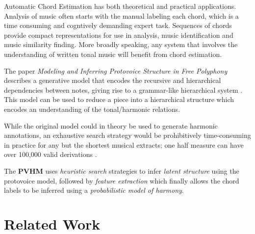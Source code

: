 \documentclass[12pt,a4paper,twoside,openright]{report}
\theoremstyle{definition}
\begin{document}
Automatic Chord Estimation has both theoretical and practical applications. 
Analysis of music often starts with the manual labeling each chord, which is a time consuming and cogntively demanding expert task. 
Sequences of chords provide compact representations for use in analysis, music identification and music similarity finding.
More broadly speaking, any system that involves the understanding of written tonal music will benefit from chord estimation. 

The paper \textit{Modeling and Inferring Protovoice Structure in Free Polyphony} describes a generative model that encodes the recursive and hierarchical dependencies between notes, giving rise to a grammar-like hierarchical system \cite{finkensiepModelingInferringProtovoice2021}.
This model can be used to reduce a piece into a hierarchical structure which encodes an understanding of the tonal/harmonic relations.



While the original model could in theory be used to generate harmonic annotations, an exhaustive search strategy would be prohibitively time-consuming in practice for any but the shortest musical extracts; one half measure can have over 100,000 valid derivations \cite{finkensiepStructureFreePolyphony2023}. 

The \textbf{PVHM} uses \textit{heuristic search} strategies to infer \textit{latent structure} using the protovoice model, followed by \textit{feature extraction} which finally allows the chord labels to be inferred using a \textit{probabilistic model of harmony}.

\section{Related Work}
\end{document}
